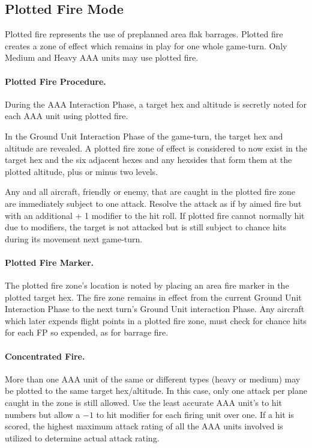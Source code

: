 \subsection{Plotted Fire Mode}

Plotted fire represents the use of preplanned area flak barrages. Plotted fire creates a zone of effect which remains in play for one whole game-turn. Only Medium and Heavy AAA units may use plotted fire.

\paragraph{Plotted Fire Procedure.} During the AAA Interaction Phase, a target hex and altitude is secretly noted for each AAA unit using plotted fire.

In the Ground Unit Interaction Phase of the game-turn, the target hex and altitude are revealed. A plotted fire zone of effect is considered to now exist in the target hex and the six adjacent hexes and any hexsides that form them at the plotted altitude, plus or minus two levels.

Any and all aircraft, friendly or enemy, that are caught in the plotted fire zone are immediately subject to one attack. Resolve the attack as if by aimed fire but with an additional + 1 modifier to the hit roll. If plotted fire cannot normally hit due to modifiers, the target is not attacked but is still subject to chance hits during its movement next game-turn.

\paragraph{Plotted Fire Marker.} The plotted fire zone's location is noted by placing an area fire marker in the plotted target hex. The fire zone remains in effect from the current Ground Unit Interaction Phase to the next turn's Ground Unit interaction Phase. Any aircraft which later expends flight points in a plotted fire zone, must check for chance hits for each FP so expended, as for barrage fire.

\paragraph{Concentrated Fire.} More than one AAA unit of the same or different types (heavy or medium) may be plotted to the same target hex/altitude. In this case, only one attack per plane caught in the zone is still allowed. Use the least accurate AAA unit's to hit numbers but allow a $-1$ to hit modifier for each firing unit over one. If a hit is scored, the highest maximum attack rating of all the AAA units involved is utilized to determine actual attack rating.

